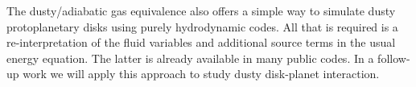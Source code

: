 The dusty/adiabatic gas equivalence also offers a simple way to simulate dusty protoplanetary disks 
using purely hydrodynamic codes. All that is required is a re-interpretation of the fluid variables and additional 
source terms in the usual energy equation. The latter is already available in many public codes. In a follow-up work
we will apply this approach to study dusty disk-planet interaction. 



 

